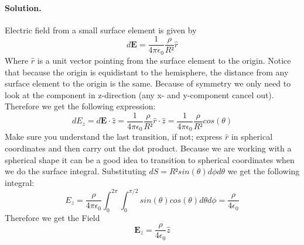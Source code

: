 \documentclass[%
oneside,                 %
final,                   %
10pt]{article}
\newenvironment{doconceexercise}{}{}
\begin{document}
\begin{doconceexercise}
\paragraph{Solution.}
Electric field from a small surface element is given by
\begin{equation}
d\mathbf{E} = \frac{1}{4\pi\epsilon_0}\frac{\rho}{R²}\hat{r}
\end{equation}
Where $\hat{r}$ is a unit vector pointing from the surface element to the origin. Notice that because the origin is equidistant to the hemisphere, the distance from any surface element to the origin is the same. Because of symmetry we only need to look at the component in z-direction (any x- and y-component cancel out). Therefore we get the following expression:
\begin{equation}
dE_z = d\mathbf{E}\cdot\hat{z} = \frac{1}{4\pi\epsilon_0}\frac{\rho}{R²}\hat{r} \cdot \hat{z} = \frac{1}{4\pi\epsilon_0}\frac{\rho}{R²}cos(\theta)
\end{equation}
Make sure you understand the last transition, if not; express $\hat{r}$ in spherical coordinates and then carry out the dot product. Because we are working with a spherical shape it can be a good idea to transition to spherical coordinates when we do the surface integral. Substituting $dS = R²sin(\theta)d\phi d\theta$ we get the following integral:
\begin{equation}
E_z = \frac{\rho}{4\pi \epsilon_0} \int_0^{2\pi}\int_0^{\pi/2}sin(\theta)cos(\theta)d\theta d\phi = \frac{\rho}{4\epsilon_0}
\end{equation}
Therefore we get the Field
\begin{equation}
\mathbf{E}_z = \frac{\rho}{4\epsilon_0}\hat{z}
\end{equation}


\end{doconceexercise}



\end{document}
